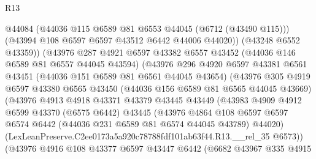 \begin{lexlean}{R13}
\begin{coremodule}
                          @44084
                          (@44036 @115 @6589 @81 @6553 @44045 (@6712 (@43490 @115)))
                          (@43994 @108 @6597 @6597 @43512 @6442 @44006 @44020))
                        (@43248 @6552 @43359))
                      (@43976
                        @287
                        @4921
                        @6597
                        @43382
                        @6557
                        @43452
                        (@44036 @146 @6589 @81 @6557 @44045 @43594)
                        (@43976
                          @296
                          @4920
                          @6597
                          @43381
                          @6561
                          @43451
                          (@44036 @151 @6589 @81 @6561 @44045 @43654)
                          (@43976
                            @305
                            @4919
                            @6597
                            @43380
                            @6565
                            @43450
                            (@44036 @156 @6589 @81 @6565 @44045 @43669)
                            (@43976
                              @4913
                              @4918
                              @43371
                              @43379
                              @43445
                              @43449
                              (@43983
                                @4909
                                @4912
                                @6599
                                @43370
                                (@6575 @6442)
                                @43445
                                (@43976
                                  @4864
                                  @108
                                  @6597
                                  @6597
                                  @6574
                                  @6442
                                  (@44036 @231 @6589 @81 @6574 @44045 @43789)
                                  @44020)
                                (LexLeanPreserve.C2ee0173a5a920c78788fdf101ab63f44.R13.__rel_35
                                  @6573))
                              (@43976
                                @4916
                                @108
                                @43377
                                @6597
                                @43447
                                @6442
                                (@6682
                                  @43967
                                  @335
                                  @4915

\end{coremodule}
\end{lexlean}
